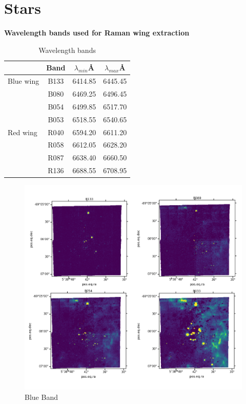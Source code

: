 \documentclass[useAMS, usenatbib, a4paper]{mnras}
\begin{document}
\section{Stars}


{\bf Wavelength bands used for Raman wing extraction}

\begin{table}
\centering
\caption{Wavelength bands}
\label{tab:bands}
\begin{tabular}{lccc}
\hline
 & Band & $\lambda_{min}$\AA  & $\lambda_{max}$\AA \\
\hline
Blue wing & B133 & 6414.85 & 6445.45 \\
          & B080 & 6469.25 & 6496.45 \\
          & B054 & 6499.85 & 6517.70 \\
          & B053 & 6518.55 & 6540.65 \\
Red wing  & R040 & 6594.20 & 6611.20 \\
          & R058 & 6612.05 & 6628.20 \\
          & R087 & 6638.40 & 6660.50 \\
          & R136 & 6688.55 & 6708.95 \\
\hline
\end{tabular}
\end{table}


\begin{figure}
\centering
\includegraphics[width=\columnwidth]{Figures/B_band.png}
\caption{Blue Band}
\label{fig:BB}
\end{figure}
\end{document}
